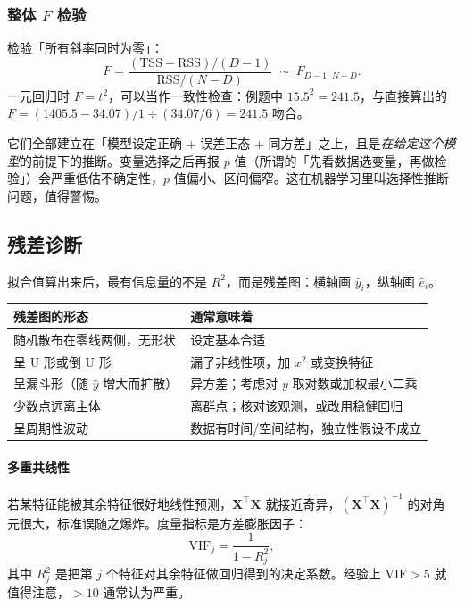 \documentclass[11pt,a4paper,fontset=windows,zihao=-4]{ctexart}
\newcommand{\bX}{\mathbf{X}}
\newcommand{\tp}{^{\top}}
\newcommand{\tabhead}{\sffamily\bfseries\color{navy}}
\begin{document}
\subsubsection{整体 \texorpdfstring{$F$}{F} 检验}

检验「所有斜率同时为零」：
\begin{equation}
  F=\frac{(\mathrm{TSS}-\mathrm{RSS})/(D-1)}{\mathrm{RSS}/(N-D)}\;\sim\;F_{D-1,\,N-D} .
\end{equation}
一元回归时 $F=t^2$，可以当作一致性检查：例题中 $15.5^2=241.5$，与直接算出的 $F=(1405.5-34.07)/1\div(34.07/6)=241.5$ 吻合。

\begin{warn}[这些 $p$ 值有条件]
它们全部建立在「模型设定正确 + 误差正态 + 同方差」之上，且是\emph{在给定这个模型}的前提下的推断。变量选择之后再报 $p$ 值（所谓的「先看数据选变量，再做检验」）会严重低估不确定性，$p$ 值偏小、区间偏窄。这在机器学习里叫选择性推断问题，值得警惕。
\end{warn}

\subsection{残差诊断}

拟合值算出来后，最有信息量的不是 $R^2$，而是残差图：横轴画 $\hat y_i$，纵轴画 $\hat e_i$。

\begin{center}
\small
\begin{tabular}{@{}p{5.3cm}p{8.9cm}@{}}
\toprule
\rowcolor{navy!7}
\tabhead 残差图的形态 & \tabhead 通常意味着\\
\midrule
随机散布在零线两侧，无形状 & 设定基本合适\\[2pt]
呈 U 形或倒 U 形 & 漏了非线性项，加 $x^2$ 或变换特征\\
呈漏斗形（随 $\hat y$ 增大而扩散） & 异方差；考虑对 $y$ 取对数或加权最小二乘\\
少数点远离主体 & 离群点；核对该观测，或改用稳健回归\\
呈周期性波动 & 数据有时间/空间结构，独立性假设不成立\\
\bottomrule
\end{tabular}
\end{center}

\paragraph{多重共线性}若某特征能被其余特征很好地线性预测，$\bX\tp\bX$ 就接近奇异，$(\bX\tp\bX)^{-1}$ 的对角元很大，标准误随之爆炸。度量指标是方差膨胀因子：
\begin{equation}
  \mathrm{VIF}_j=\frac{1}{1-R_j^2},
\end{equation}
其中 $R_j^2$ 是把第 $j$ 个特征对其余特征做回归得到的决定系数。经验上 $\mathrm{VIF}>5$ 就值得注意，$>10$ 通常认为严重。
\end{document}
